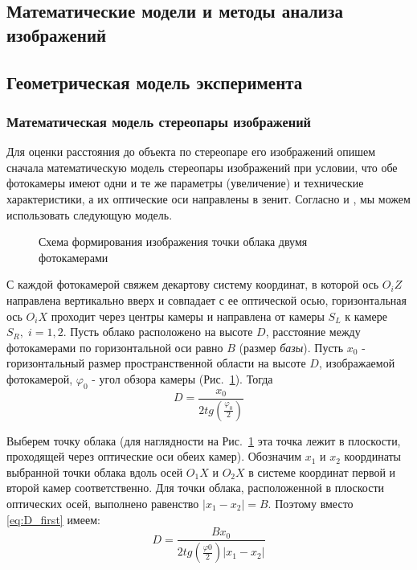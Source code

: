\begin{center}\section{Математические модели  и методы анализа  изображений}\end{center}
\subsection{Геометрическая модель эксперимента}\label{geometry}

\subsubsection{Математическая модель стереопары изображений}
Для оценки расстояния до объекта по стереопаре его изображений опишем сначала математическую модель стереопары изображений при условии, что обе фотокамеры имеют одни и те же параметры (увеличение) и технические характеристики, а их оптические оси направлены в зенит. Согласно \cite{book:andreev_diplom} и \cite{article:stereo}, мы можем использовать следующую модель.

\begin{figure}
\caption{Схема формирования изображения точки облака двумя фотокамерами}
\label{img:scheme}
\end{figure}


С каждой фотокамерой свяжем декартову систему координат, в которой ось $O_iZ$ направлена вертикально вверх и совпадает с ее оптической осью, горизонтальная ось $O_iX$ проходит через центры камеры и направлена от камеры $S_L$ к камере $S_R, \; i=1,2$. Пусть облако расположено на высоте $D$, расстояние между фотокамерами по горизонтальной оси равно $B$ (размер \emph{базы}). Пусть $x_0$ - горизонтальный размер пространственной области на высоте $D$, изображаемой фотокамерой, $\varphi_0$ - угол обзора камеры (Рис.~\ref{img:scheme}). Тогда
\begin{equation}\label{eq:D_first}
    D = \frac{x_0}{2tg(\frac{\varphi_0}{2})}
\end{equation}


Выберем точку облака (для наглядности на Рис.~\ref{img:scheme} эта точка лежит в плоскости, проходящей через оптические оси обеих камер). Обозначим $x_1$ и $x_2$ координаты выбранной точки облака вдоль осей $O_1X$ и $O_2X$ в системе координат первой и второй камер соответственно. Для точки облака, расположенной в плоскости оптических осей, выполнено равенство  $|x_1 - x_2| = B$. Поэтому вместо \eqref{eq:D_first} имеем:
\begin{equation}\label{eq:D_second}
    D = \frac{Bx_0}{2tg(\frac{\varphi0}{2})|x_1 - x_2|}
\end{equation}


